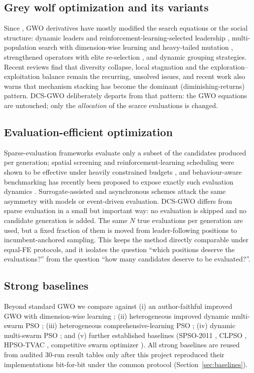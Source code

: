 \documentclass[journal]{IEEEtran}
\newcommand{\method}{DCS-GWO}
\begin{document}
\subsection{Grey wolf optimization and its variants}
Since \cite{mirjalili2014gwo}, GWO derivatives have mostly modified the
search equations or the social structure: dynamic leaders and
reinforcement-learning-selected leadership \cite{maleki2025rlgwo},
multi-population search with dimension-wise learning and heavy-tailed
mutation \cite{wang2025dmsgwo}, strengthened operators with elite re-selection
\cite{chen2025sgwo}, and dynamic grouping strategies. Recent reviews
\cite{air2026review} find that diversity collapse, local stagnation and the
exploration--exploitation balance remain the recurring, unsolved issues, and
recent work also warns that mechanism stacking has become the dominant
(diminishing-returns) pattern. \method{} deliberately departs from that
pattern: the GWO equations are untouched; only the \emph{allocation} of the
scarce evaluations is changed.

\subsection{Evaluation-efficient optimization}
Sparse-evaluation frameworks evaluate only a subset of the candidates
produced per generation; spatial screening and reinforcement-learning
scheduling were shown to be effective under heavily constrained budgets
\cite{ssrlpso2026}, and behaviour-aware benchmarking has recently been
proposed to expose exactly such evaluation dynamics \cite{eabif2026}.
Surrogate-assisted and asynchronous schemes attack the same asymmetry with
models or event-driven evaluation. \method{} differs from sparse evaluation
in a small but important way: no evaluation is skipped and no candidate
generation is added. The same $N$ true evaluations per generation are used,
but a fixed fraction of them is moved from leader-following positions to
incumbent-anchored sampling. This keeps the method directly comparable under
equal-FE protocols, and it isolates the question ``which positions deserve
the evaluations?'' from the question ``how many candidates deserve to be
evaluated?''.

\subsection{Strong baselines}
Beyond standard GWO we compare against (i) an author-faithful improved GWO
with dimension-wise learning \cite{nadimi2021igwo}; (ii) heterogeneous
improved dynamic multi-swarm PSO \cite{varna2020hidms}; (iii) heterogeneous
comprehensive-learning PSO \cite{lynn2015hclpso}; (iv) dynamic multi-swarm
PSO \cite{liang2005dms}; and (v) further established baselines (SPSO-2011
\cite{clerc2012spso}, CLPSO \cite{liang2006clpso}, HPSO-TVAC
\cite{ratnaweera2004hpso}, competitive swarm optimizer \cite{cheng2015cso}).
All strong baselines are reused from audited 30-run result tables only after
this project reproduced their implementations bit-for-bit under the common
protocol (Section~\ref{sec:baselines}).
\end{document}
